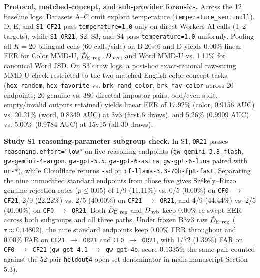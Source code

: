 \textbf{Protocol, matched-concept, and sub-provider forensics.} Across the 12 baseline logs, Datasets A--C omit explicit temperature (\texttt{temperature\_\allowbreak{}sent=\allowbreak{}null}). D, E, and \texttt{S1\_\allowbreak{}CF21} pass \texttt{temperature=\allowbreak{}1.\allowbreak{}0} only on direct Workers AI calls (1--2 targets), while \texttt{S1\_\allowbreak{}OR21}, S2, S3, and S4 pass \texttt{temperature=\allowbreak{}1.\allowbreak{}0} uniformly. Pooling all $K=20$ bilingual cells (60 calls/side) on B-20\ensuremath{\times}6 and D yields 0.00\% linear EER for Color MMD-U, $\tilde D_{\mathrm{E\mbox{-}reg}}{}$, $D_{\mathrm{hex}}{}$, and Word MMD-U vs. 1.11\% for canonical Word JSD. On S3's raw logs, a post-hoc exact-rational raw-string MMD-U check restricted to the two matched English color-concept tasks (\texttt{hex\_\allowbreak{}random}, \texttt{hex\_\allowbreak{}favorite} vs. \texttt{brk\_\allowbreak{}rand\_\allowbreak{}color}, \texttt{brk\_\allowbreak{}fav\_\allowbreak{}color} across 20 endpoints; 20 genuine vs. 380 directed impostor pairs, odd/even split, empty/invalid outputs retained) yields linear EER of 17.92\% (color, 0.9156 AUC) vs. 20.21\% (word, 0.8349 AUC) at 3v3 (first 6 draws), and 5.26\% (0.9909 AUC) vs. 5.00\% (0.9784 AUC) at 15v15 (all 30 draws).


\textbf{Study S1 reasoning-parameter subgroup check.} In S1, \texttt{OR21} passes \texttt{reasoning.\allowbreak{}effort=\allowbreak{}"low"} on five reasoning endpoints (\texttt{gw-\allowbreak{}gemini-\allowbreak{}3.\allowbreak{}8-\allowbreak{}flash}, \texttt{gw-\allowbreak{}gemini-\allowbreak{}4-\allowbreak{}argon}, \texttt{gw-\allowbreak{}gpt-\allowbreak{}5.\allowbreak{}5}, \texttt{gw-\allowbreak{}gpt-\allowbreak{}6-\allowbreak{}astra}, \texttt{gw-\allowbreak{}gpt-\allowbreak{}6-\allowbreak{}luna} paired with \texttt{or-\allowbreak{}*}), while Cloudflare returns \texttt{-\allowbreak{}sd} on \texttt{cf-\allowbreak{}llama-\allowbreak{}3.\allowbreak{}3-\allowbreak{}70b-\allowbreak{}fp8-\allowbreak{}fast}. Separating the nine unmodified standard endpoints from those five gives Sz\'{e}kely--Rizzo genuine rejection rates ($p \le 0.05$) of 1/9 (11.11\%) vs. 0/5 (0.00\%) on \texttt{CF0 \ensuremath{\rightarrow} CF21}, 2/9 (22.22\%) vs. 2/5 (40.00\%) on \texttt{CF21 \ensuremath{\rightarrow} OR21}, and 4/9 (44.44\%) vs. 2/5 (40.00\%) on \texttt{CF0 \ensuremath{\rightarrow} OR21}. Both $\tilde D_{\mathrm{E\mbox{-}reg}}{}$ and $D_{\mathrm{hyb}}{}$ keep 0.00\% re-swept EER across both subgroups and all three paths. Under frozen B3v3 raw $\tilde D_{\mathrm{E\mbox{-}reg}}{}$ ($\tau \approx 0.14802$), the nine standard endpoints keep 0.00\% FRR throughout and 0.00\% FAR on \texttt{CF21 \ensuremath{\rightarrow} OR21} and \texttt{CF0 \ensuremath{\rightarrow} OR21}, with 1/72 (1.39\%) FAR on \texttt{CF0 \ensuremath{\rightarrow} CF21} (\texttt{gw-\allowbreak{}gpt-\allowbreak{}4.\allowbreak{}1 \ensuremath{\rightarrow} gw-\allowbreak{}gpt-\allowbreak{}4o}, score 0.13359; the same pair counted against the 52-pair \texttt{heldout4} open-set denominator in main-manuscript Section 5.3).


